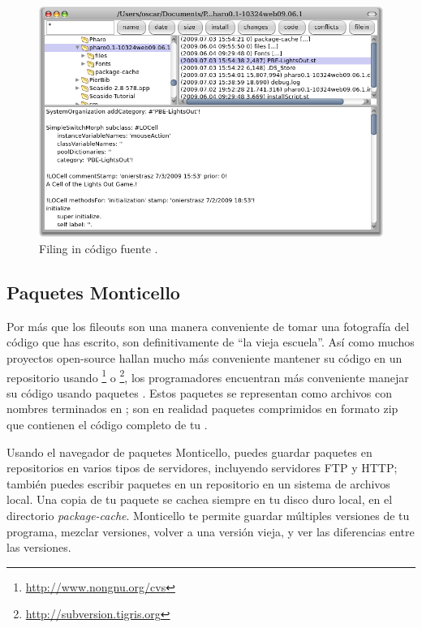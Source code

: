\documentclass[a4paper,10pt,twoside]{book}
\begin{document}

\begin{figure}[ht]
\centerline {\includegraphics[width=\textwidth]{FileIn}}
\caption{Filing in c\'odigo fuente \pharo.
}
\end{figure}


\subsection{Paquetes Monticello}
Por m\'as que los fileouts son una manera conveniente de tomar una fotograf\'ia del c\'odigo que has escrito, son definitivamente de ``la vieja escuela''.
As\'i como muchos proyectos open-source hallan mucho m\'as conveniente mantener su c\'odigo en un repositorio usando \footnote{\url{http://www.nongnu.org/cvs}} o \footnote{\url{http://subversion.tigris.org}}, los programadores \pharo encuentran m\'as conveniente manejar su c\'odigo usando paquetes .
Estos paquetes se representan como archivos con nombres terminados en ; son en realidad paquetes comprimidos en formato zip que contienen el c\'odigo completo de tu .

Usando el navegador de paquetes Monticello, puedes guardar paquetes en repositorios en varios tipos de servidores, incluyendo servidores FTP y HTTP; tambi\'en puedes escribir paquetes en un repositorio en un sistema de archivos local. 
Una copia de tu paquete se cachea siempre en tu disco duro local, en el directorio \emph{package-cache}.
Monticello te permite guardar m\'ultiples versiones de tu programa, mezclar versiones, volver a una versi\'on vieja, y ver las diferencias entre las versiones.
\end{document}
